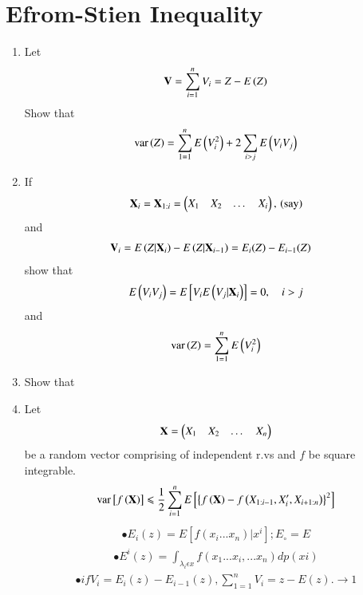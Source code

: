 \documentclass[journal,12pt,twocolumn]{IEEEtran}
\renewcommand\thesection{\arabic{section}}
\begin{document}
\section{Efrom-Stien Inequality}
\begin{enumerate}[label=\thesection.\arabic*,ref=\thesection.\theenumi]
\item Let
\begin{align}
\mathbf{V}= \sum_{i=1}^{n}{V}_i = Z - E\left(Z\right)
\end{align}
Show that 
\begin{align}
\text{var} \left(Z\right) = \sum_{1=1}^{n}E\left( V_i^2\right)+2\sum_{i>j}E\left(V_i V_j\right)
\end{align}
\item If
\begin{align}
\mathbf{X}_i = \mathbf{X}_{1:i}=\begin{pmatrix}X_1 & X_2 & \dots & X_i\end{pmatrix},\, \text{(say)}
\end{align}
%
and 
\begin{align}
\mathbf{V}_i =E\left(Z|\mathbf{X}_{i}\right)-E\left(Z|\mathbf{X}_{i-1}\right) 
 &=E_i(Z)-E_{i-1}(Z) 
\end{align}
show that 
\begin{align}
E\left(V_i V_j\right) = E{}\left[V_i E\left(V_j|\mathbf{X}_i\right)\right] = 0, \quad i > j
\end{align}
and
\begin{align}
\text{var} \left(Z\right) = \sum_{1=1}^{n}E\left( V_i^2\right) 
\end{align}
\item Show that 
\item Let
\begin{align}
\mathbf{X}= \begin{pmatrix}X_1 & X_2 &  \dots & X_n\end{pmatrix}
\end{align}
be a random vector comprising of independent r.vs and $f$ be  square integrable.
\begin{align}
\text{var}{}\left[f\left(\mathbf{X}\right)\right] \leqslant \frac{1}{2}\sum_{i=1}^{n} E{}\left[\left\{f\left(\mathbf{X}\right)-f\left(X_{1:i-1},X_{i}^{\prime},X_{i+1:n}\right)\right\}^2\right]
\end{align}
\begin{align}
\bullet E_i(z)=E[f(x_i...x_n)|x^i]; E_\circ=E
\end{align}
\begin{align}
\bullet E^i(z)= \int_{\lambda_i \epsilon x} f(x_1...x_i,...x_n)dp(xi)
\end{align}
\begin{align}
\bullet if V_i=E_i(z)-E_{i-1}(z),\sum_{1=1}^{n} V_i=z-E(z).\rightarrow 1
\end{align}
\begin{align}

\end{align}
\end{enumerate}
\end{document}
